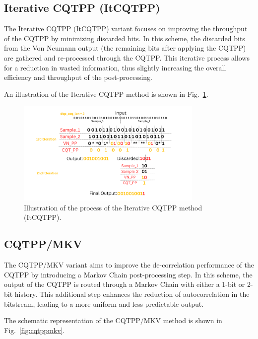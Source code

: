 \subsection{Iterative CQTPP (ItCQTPP)}
The Iterative CQTPP (ItCQTPP) variant focuses on improving the throughput of the CQTPP by minimizing discarded bits.  
In this scheme, the discarded bits from the Von Neumann output (the remaining bits after applying the CQTPP) are gathered and re-processed through the CQTPP.  
This iterative process allows for a reduction in wasted information, thus slightly increasing the overall efficiency and throughput of the post-processing.  

An illustration of the Iterative CQTPP method is shown in Fig.~\ref{fig:itcqtpp}.

\begin{figure}[h!]
    \centering
    \includegraphics[width=0.8\textwidth]{figures/itcqtpp.png}
    \caption{Illustration of the process of the Iterative CQTPP method (ItCQTPP).}
    \label{fig:itcqtpp}
\end{figure}

\subsection{CQTPP/MKV}
The CQTPP/MKV variant aims to improve the de-correlation performance of the CQTPP by introducing a Markov Chain post-processing step.  
In this scheme, the output of the CQTPP is routed through a Markov Chain with either a 1-bit or 2-bit history.  
This additional step enhances the reduction of autocorrelation in the bitstream, leading to a more uniform and less predictable output.  

The schematic representation of the CQTPP/MKV method is shown in Fig.~\ref{fig:cqtppmkv}.



